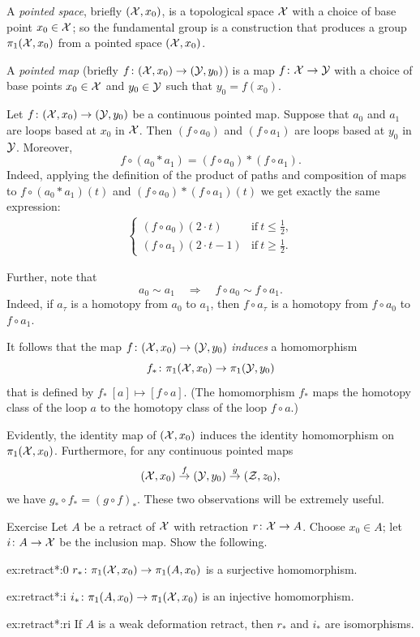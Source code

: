 A \emph{pointed space}, briefly $(\mathcal{X},x_0)$, is a topological space $\mathcal{X}$ with a choice of base point $x_0\in \mathcal{X}$;
so the fundamental group is a construction that produces a group $\pi_1(\mathcal{X},x_0)$ from a pointed space $(\mathcal{X},x_0)$.

A \emph{pointed map} (briefly $f\colon(\mathcal{X},x_0)\to (\mathcal{Y},y_0)$) is a map $f\:\c{X}\z\to \c{Y}$ with a choice of base points $x_0\in \mathcal{X}$ and $y_0\in \mathcal{Y}$ such that $y_0=f(x_0)$.

Let $f\colon(\mathcal{X},x_0)\to (\mathcal{Y},y_0)$ be a continuous pointed map.
Suppose that $a_0$ and $a_1$ are loops based at $x_0$ in $\mathcal{X}$.
Then $(f\circ a_0)$ and $(f\circ a_1)$ are loops based at $y_0$ in $\mathcal{Y}$.
Moreover,
\[f\circ(a_0*a_1)=(f\circ a_0)*(f\circ a_1).\]
Indeed, applying the definition of the product of paths and composition of maps to $f\circ(a_0*a_1)(t)$ and $(f\circ a_0)*(f\circ a_1)(t)$ we get exactly the same expression:
\begin{align*}
\begin{cases}
(f\circ a_0)(2\cdot t)&\text{if}\ t\le \tfrac12,
\\
(f\circ a_1)(2\cdot t-1)&\text{if}\ t\ge \tfrac12.
\end{cases}
\end{align*}

Further, note that
\[a_0\sim a_1 \quad\Rightarrow\quad f\circ a_0\sim f\circ a_1.\]
Indeed, if $a_\tau$ is a homotopy from $a_0$ to $a_1$, then $f\circ a_\tau$ is a homotopy from $f\circ a_0$ to $f\circ a_1$.

It follows that the map $f\colon(\mathcal{X},x_0)\to (\mathcal{Y},y_0)$ \emph{induces} a homomorphism
\[f_*\colon\pi_1(\mathcal{X},x_0)\to \pi_1(\mathcal{Y},y_0)\]
that is defined by $f_*\:[a]\mapsto [f\circ a]$.
(The homomorphism $f_*$ maps the homotopy class of the loop $a$ to the homotopy class of the loop $f\circ a$.)

Evidently, the identity map of $(\mathcal{X},x_0)$ induces the identity homomorphism on $\pi_1(\mathcal{X},x_0)$.
Furthermore, for any continuous pointed maps
\[(\mathcal{X},x_0)\stackrel{f}{\to}(\mathcal{Y},y_0)\stackrel{g}{\to}(\mathcal{Z},z_0),\]
we have $g_*\circ f_*=(g\circ f)_*$.
These two observations will be extremely useful.

\begin{thm}[!]{Exercise}\label{ex:retract*}
Let $A$ be a retract of $\mathcal{X}$ with retraction $r\:\c{X}\z\to A$.
Choose $x_0\in A$; let $i\colon A\to\mathcal{X}$ be the inclusion map.
Show the following.
\begin{subthm}{ex:retract*:0}
$r_*\colon\pi_1(\mathcal{X},x_0)\to \pi_1(A,x_0)$ is a surjective homomorphism.
\end{subthm}

\begin{subthm}{ex:retract*:i}
$i_*\colon\pi_1(A,x_0)\to \pi_1(\mathcal{X},x_0)$ is an injective homomorphism.
\end{subthm}

\begin{subthm}{ex:retract*:ri}
If $A$ is a weak deformation retract, then $r_*$ and $i_*$ are isomorphisms.
\end{subthm}


\end{thm}

